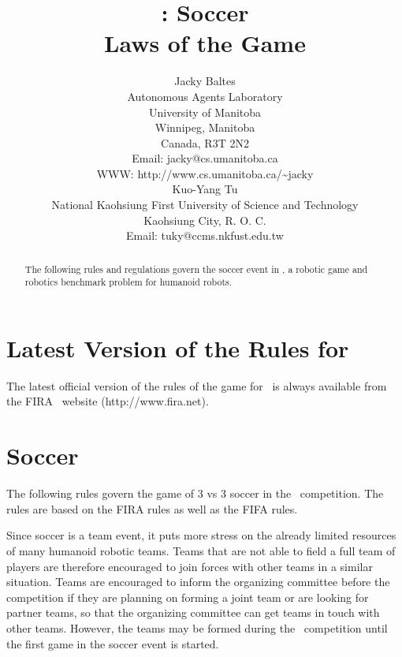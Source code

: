 \documentclass[12pt]{hurocup}
\begin{document}
\title{\HuroCup: Soccer\\
Laws of the Game \thisyear}

\author{Jacky Baltes\\
Autonomous Agents Laboratory\\
University of Manitoba\\
Winnipeg, Manitoba\\
Canada, R3T 2N2\\
Email: jacky@cs.umanitoba.ca\\
WWW: http://www.cs.umanitoba.ca/\~{ }jacky\\[5mm]
Kuo-Yang Tu\\
National Kaohsiung First University of Science and Technology\\
Kaohsiung City, R. O. C.\\
Email: tuky@ccms.nkfust.edu.tw\\
}

\maketitle
\begin{abstract}
The following rules and regulations govern the soccer event in
\HuroCup, a robotic game and robotics benchmark problem for humanoid
robots.
%
\end{abstract}

\section*{Latest Version of the Rules for \HuroCup}
\label{sec:updates}

The latest official version of the rules of the game for \HuroCup\ is
always available from the FIRA \HuroCup\ website (http://www.fira.net).

\newpage

\section{Soccer}
\label{sec:soccer}

The following rules govern the game of 3 vs 3 soccer in the \HuroCup\
competition. The rules are based on the FIRA rules as well as the FIFA
rules.

Since soccer is a team event, it puts more stress on the already
limited resources of many humanoid robotic teams. Teams that are not
able to field a full team of players are therefore encouraged to join
forces with other teams in a similar situation. Teams are encouraged
to inform the organizing committee before the competition if they are
planning on forming a joint team or are looking for partner teams, so
that the organizing committee can get teams in touch with other
teams. However, the teams may be formed during the \HuroCup\
competition until the first game in the soccer event is started.
\end{document}

